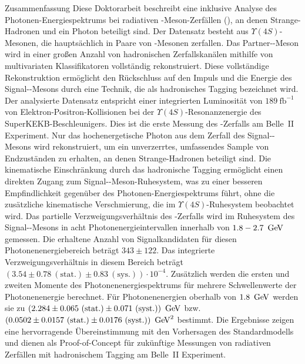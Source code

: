     \begin{abstractpage}{Zusammenfassung}
        \sloppy
        Diese Doktorarbeit beschreibt eine inklusive Analyse des Photonen-Energiespektrums bei radiativen \B-Meson-Zerfällen (\BtoXsgamma), an denen Strange-Hadronen und ein Photon beteiligt sind.
        Der Datensatz besteht aus $\Upsilon(4S)$-Mesonen, die hauptsächlich in Paare von \B-Mesonen zerfallen.
        Das Partner-\B-Meson wird in einer gro{\ss}en Anzahl von hadronischen Zerfallskanälen mithilfe von multivariaten Klassifikatoren vollständig rekonstruiert. 
        Diese vollständige Rekonstruktion ermöglicht den Rückschluss auf den Impuls und die Energie des Signal-\B-Mesons durch eine Technik, die als hadronisches Tagging bezeichnet wird.
        Der analysierte Datensatz entspricht einer integrierten Luminosität von $189~\mathrm{fb}^{-1}$ von Elektron-Positron-Kollisionen bei der $\Upsilon(4S)$-Resonanzenergie des SuperKEKB-Beschleunigers. 
        Dies ist die erste Messung des \BtoXsgamma-Zerfalls am Belle~II Experiment.
        Nur das hochenergetische Photon aus dem Zerfall des Signal-\B-Mesons wird rekonstruiert, um ein unverzerrtes, umfassendes Sample von Endzuständen zu erhalten, an denen Strange-Hadronen beteiligt sind. 
        Die kinematische Einschränkung durch das hadronische Tagging ermöglicht einen direkten Zugang zum Signal-\B-Meson-Ruhesystem, was zu einer besseren Empfindlichkeit gegenüber des Photonen-Energiespektrums führt, ohne die zusätzliche kinematische Verschmierung, die im $\Upsilon(4S)$-Ruhesystem beobachtet wird.
        Das partielle Verzweigungsverh\"altnis des \BtoXsgamma-Zerfalls wird im Ruhesystem des Signal-\B-Mesons in acht Photonenergieintervallen innerhalb von $1.8 - 2.7~\mathrm{\,Ge\kern -0.1em V}$ gemessen. 
        Die erhaltene Anzahl von Signalkandidaten für diesen Photonenenergiebereich beträgt $343 \pm 122$. 
        Das integrierte Verzweigungsverhältnis in diesem Bereich beträgt \mbox{$(3.54 \pm 0.78~(\mathrm{stat.}) \pm 0.83~(\mathrm{sys.}))\cdot10^{-4}$}.
        Zusätzlich werden die ersten und zweiten Momente des Photonenenergiespektrums für mehrere Schwellenwerte der Photonenenergie berechnet. 
        Für Photonenenergien oberhalb von $1.8~\mathrm{\,Ge\kern -0.1em V}$ werden sie zu \mbox{$(2.284 \pm 0.065~(\mathrm{stat.})\pm 0.071~(\mathrm{syst.}))~\mathrm{\,Ge\kern -0.1em V}$} bzw. \mbox{$(0.0502 \pm 0.0157~(\mathrm{stat.}) \pm 0.0176~(\mathrm{syst.}))~\mathrm{\,Ge\kern -0.1em V}^2$} bestimmt.
        Die Ergebnisse zeigen eine hervorragende Übereinstimmung mit den Vorhersagen des Standardmodells und dienen als Proof-of-Concept für zukünftige Messungen von radiativen \BtoXsgamma Zerfällen mit hadronischem Tagging am Belle~II Experiment.
    \end{abstractpage}
    